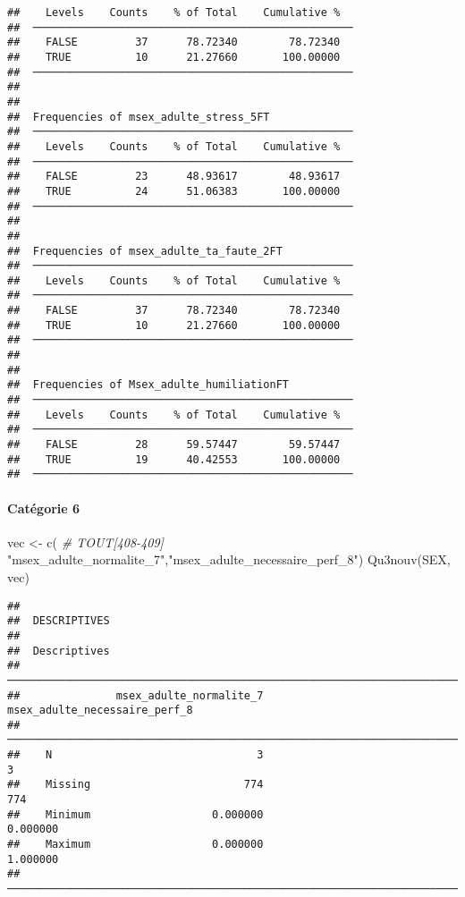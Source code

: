 \documentclass[
]{article}
\newenvironment{Shaded}{\begin{snugshade}}{\end{snugshade}}
\newcommand{\CommentTok}[1]{\textcolor[rgb]{0.56,0.35,0.01}{\textit{#1}}}
\newcommand{\FunctionTok}[1]{\textcolor[rgb]{0.00,0.00,0.00}{#1}}
\newcommand{\NormalTok}[1]{#1}
\newcommand{\OtherTok}[1]{\textcolor[rgb]{0.56,0.35,0.01}{#1}}
\newcommand{\StringTok}[1]{\textcolor[rgb]{0.31,0.60,0.02}{#1}}
\begin{document}
\begin{verbatim}
##    Levels    Counts    % of Total    Cumulative %   
##  ────────────────────────────────────────────────── 
##    FALSE         37      78.72340        78.72340   
##    TRUE          10      21.27660       100.00000   
##  ────────────────────────────────────────────────── 
## 
## 
##  Frequencies of msex_adulte_stress_5FT              
##  ────────────────────────────────────────────────── 
##    Levels    Counts    % of Total    Cumulative %   
##  ────────────────────────────────────────────────── 
##    FALSE         23      48.93617        48.93617   
##    TRUE          24      51.06383       100.00000   
##  ────────────────────────────────────────────────── 
## 
## 
##  Frequencies of msex_adulte_ta_faute_2FT            
##  ────────────────────────────────────────────────── 
##    Levels    Counts    % of Total    Cumulative %   
##  ────────────────────────────────────────────────── 
##    FALSE         37      78.72340        78.72340   
##    TRUE          10      21.27660       100.00000   
##  ────────────────────────────────────────────────── 
## 
## 
##  Frequencies of Msex_adulte_humiliationFT           
##  ────────────────────────────────────────────────── 
##    Levels    Counts    % of Total    Cumulative %   
##  ────────────────────────────────────────────────── 
##    FALSE         28      59.57447        59.57447   
##    TRUE          19      40.42553       100.00000   
##  ──────────────────────────────────────────────────
\end{verbatim}

\hypertarget{catuxe9gorie-6-1}{%
\paragraph{Catégorie 6}\label{catuxe9gorie-6-1}}

\begin{Shaded}
\begin{Highlighting}[]
\NormalTok{vec }\OtherTok{\textless{}{-}} \FunctionTok{c}\NormalTok{(   }\CommentTok{\# TOUT[408{-}409]}
  \StringTok{"msex\_adulte\_normalite\_7"}\NormalTok{,}\StringTok{"msex\_adulte\_necessaire\_perf\_8"}\NormalTok{)}
\FunctionTok{Qu3nouv}\NormalTok{(SEX, vec)}
\end{Highlighting}
\end{Shaded}

\begin{verbatim}
## 
##  DESCRIPTIVES
## 
##  Descriptives                                                            
##  ─────────────────────────────────────────────────────────────────────── 
##               msex_adulte_normalite_7    msex_adulte_necessaire_perf_8   
##  ─────────────────────────────────────────────────────────────────────── 
##    N                                3                                3   
##    Missing                        774                              774   
##    Minimum                   0.000000                         0.000000   
##    Maximum                   0.000000                         1.000000   
##  ───────────────────────────────────────────────────────────────────────
\end{verbatim}
\end{document}
